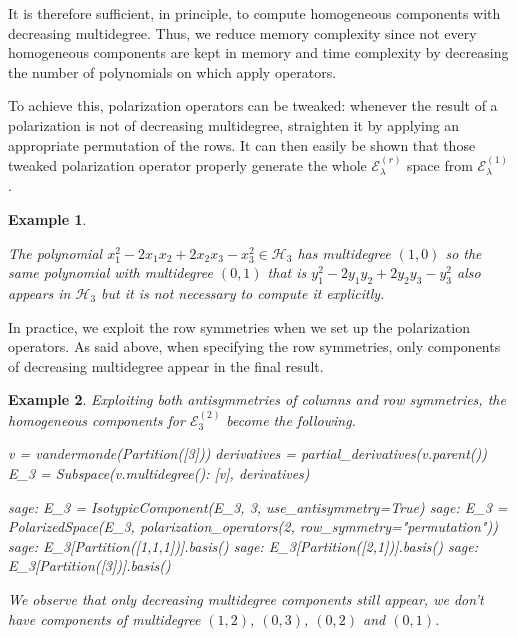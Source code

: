 \documentclass[letter,12pt]{article}
\newtheorem{example}{Example}
\begin{document}
	It is therefore sufficient, in principle, to compute homogeneous components with decreasing multidegree. Thus, we reduce memory complexity since not every homogeneous components are kept in memory and time complexity by decreasing the number of polynomials on which apply operators. 
	
	To achieve this, polarization operators can be tweaked: whenever the result of a polarization is not of decreasing multidegree, straighten it by applying an appropriate permutation of the rows. It can then easily be shown that those tweaked polarization operator properly generate the whole $\mathcal{E}_\lambda^{(r)}$ space from $\mathcal{E}_\lambda^ {(1)}$.
	
	\begin{example} ~ 
		
		The polynomial $x_1^2 - 2x_1x_2 + 2x_2x_3 - x_3^2 \in \mathcal{H}_{3}$ has multidegree $(1,0)$ so the same polynomial with multidegree $(0,1)$ that is $y_1^2 - 2y_1y_2 + 2y_2y_3 - y_3^2$ also appears in $\mathcal{H}_{3}$ but it is not necessary to compute it explicitly.  
	\end{example}

	In practice, we exploit the row symmetries when we set up the polarization operators. As said above, when specifying the row symmetries, only components of decreasing multidegree appear in the final result. 
	
	\begin{example} Exploiting both antisymmetries of columns and row symmetries, the homogeneous components for $\mathcal{E}_3^{(2)}$ become the following.
		\begin{sagesilent}
			v = vandermonde(Partition([3]))
			derivatives = partial_derivatives(v.parent())
			E_3 = Subspace({v.multidegree(): [v]}, derivatives)
		\end{sagesilent}
		\begin{sagecommandline}
			sage: E_3 = IsotypicComponent(E_3, 3, use_antisymmetry=True)
			sage: E_3 = PolarizedSpace(E_3, polarization_operators(2, row_symmetry="permutation"))
			sage: E_3[Partition([1,1,1])].basis()
			sage: E_3[Partition([2,1])].basis()
			sage: E_3[Partition([3])].basis()
		\end{sagecommandline}	
	We observe that only decreasing multidegree components still appear, we don't have components of multidegree $(1,2)$, $(0,3)$, $(0,2)$ and $(0,1)$.
	\end{example}
	
\end{document}
